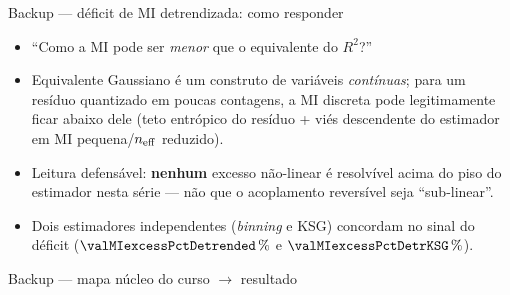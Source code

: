 \documentclass[aspectratio=169,11pt]{beamer}
\begin{document}
\begin{frame}{Backup --- déficit de MI detrendizada: como responder}
  \begin{itemize}
    \item ``Como a MI pode ser \emph{menor} que o equivalente do $R^2$?''
    \item Equivalente Gaussiano é um construto de variáveis \emph{contínuas};
          para um resíduo quantizado em poucas contagens, a MI discreta
          pode legitimamente ficar abaixo dele (teto entrópico do resíduo
          + viés descendente do estimador em MI pequena/$n_{\mathrm{eff}}$ reduzido).
    \item Leitura defensável: \textbf{nenhum} excesso não-linear é
          resolvível acima do piso do estimador nesta série --- não que o
          acoplamento reversível seja ``sub-linear''.
    \item Dois estimadores independentes (\emph{binning} e KSG) concordam
          no sinal do déficit ($\valMIexcessPctDetrended\,\%$ e
          $\valMIexcessPctDetrKSG\,\%$).
  \end{itemize}
\end{frame}

\begin{frame}{Backup --- mapa n\'ucleo do curso $\rightarrow$ resultado}
  \centering
\end{frame}
\end{document}
